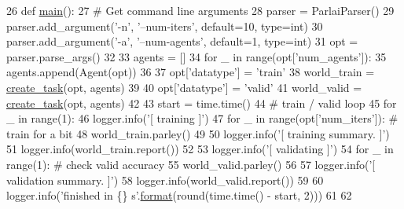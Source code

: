 \begin{DoxyCode}
26 \textcolor{keyword}{def }\hyperlink{namespacebase__train_afacf60925509c7e52f77f41e331261f3}{main}():
27     \textcolor{comment}{# Get command line arguments}
28     parser = ParlaiParser()
29     parser.add\_argument(\textcolor{stringliteral}{'-n'}, \textcolor{stringliteral}{'--num-iters'}, default=10, type=int)
30     parser.add\_argument(\textcolor{stringliteral}{'-a'}, \textcolor{stringliteral}{'--num-agents'}, default=1, type=int)
31     opt = parser.parse\_args()
32 
33     agents = []
34     \textcolor{keywordflow}{for} \_ \textcolor{keywordflow}{in} range(opt[\textcolor{stringliteral}{'num\_agents'}]):
35         agents.append(Agent(opt))
36 
37     opt[\textcolor{stringliteral}{'datatype'}] = \textcolor{stringliteral}{'train'}
38     world\_train = \hyperlink{namespaceparlai_1_1core_1_1worlds_a79969c7ba76d4b3c500f5bb776444dc6}{create\_task}(opt, agents)
39 
40     opt[\textcolor{stringliteral}{'datatype'}] = \textcolor{stringliteral}{'valid'}
41     world\_valid = \hyperlink{namespaceparlai_1_1core_1_1worlds_a79969c7ba76d4b3c500f5bb776444dc6}{create\_task}(opt, agents)
42 
43     start = time.time()
44     \textcolor{comment}{# train / valid loop}
45     \textcolor{keywordflow}{for} \_ \textcolor{keywordflow}{in} range(1):
46         logger.info(\textcolor{stringliteral}{'[ training ]'})
47         \textcolor{keywordflow}{for} \_ \textcolor{keywordflow}{in} range(opt[\textcolor{stringliteral}{'num\_iters'}]):  \textcolor{comment}{# train for a bit}
48             world\_train.parley()
49 
50         logger.info(\textcolor{stringliteral}{'[ training summary. ]'})
51         logger.info(world\_train.report())
52 
53         logger.info(\textcolor{stringliteral}{'[ validating ]'})
54         \textcolor{keywordflow}{for} \_ \textcolor{keywordflow}{in} range(1):  \textcolor{comment}{# check valid accuracy}
55             world\_valid.parley()
56 
57         logger.info(\textcolor{stringliteral}{'[ validation summary. ]'})
58         logger.info(world\_valid.report())
59 
60     logger.info(\textcolor{stringliteral}{'finished in \{\} s'}.\hyperlink{namespaceparlai_1_1chat__service_1_1services_1_1messenger_1_1shared__utils_a32e2e2022b824fbaf80c747160b52a76}{format}(round(time.time() - start, 2)))
61 
62 
\end{DoxyCode}
